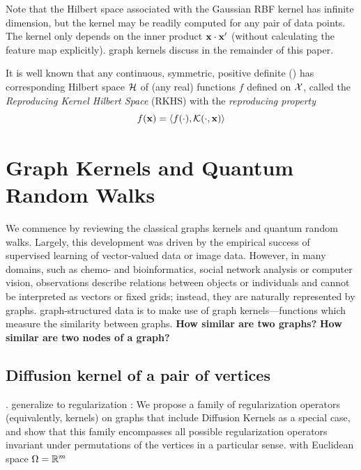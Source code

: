 Note that the Hilbert space associated with the Gaussian RBF kernel has infinite dimension, but the kernel may be readily computed for any pair of data points.
The kernel only depends on the inner product $\vb{x}\cdot\vb{x}'$ (without calculating the feature map explicitly). 
graph kernels discuss in the remainder of this paper.

\begin{definition}\label{def:rkhs}
	It is well known that any continuous, symmetric, positive definite () has corresponding Hilbert space $\mathcal{H}$ of (any real) functions $f$ defined on $\mathcal{X}$, 
	called the \emph{Reproducing Kernel Hilbert Space} (RKHS) with the \emph{reproducing property}
	\begin{equation}
		f(\vb{x}) = \expval{f(\cdot),\mathcal{K}(\cdot,\vb{x})}
	\end{equation}
\end{definition}

\section{Graph Kernels and Quantum Random Walks}
We commence by reviewing the classical graphs kernels and quantum random walks.
Largely, this development was driven by the empirical success of supervised learning of vector-valued data or image data. However, in many domains, such as chemo- and bioinformatics, social network analysis or computer vision, observations describe relations between objects or individuals and cannot be interpreted as vectors or fixed grids; instead, they are naturally represented by graphs.
\cite{kriegeSurveyGraphKernels2020}
graph-structured data is to make use of graph kernels—functions which measure the similarity between graphs.
\textbf{How similar are two graphs?}
\textbf{How similar are two nodes of a graph?}

\subsection{Diffusion kernel of a pair of vertices}
\cite{kondorDiffusionKernelsGraphs2002}.
generalize to regularization \cite{kondorGraphletSpectrum2009}: 
We propose a family of regularization operators (equivalently, kernels) on graphs that include Diffusion Kernels as a special case, and show that this family encompasses all possible regularization operators invariant under permutations of the vertices in a particular sense.
\cite{smolaKernelsRegularizationGraphs2003}
with Euclidean space $\Omega = \mathbb{R}^m$

